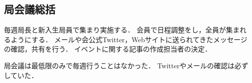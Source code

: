 \subsection*{局会議総括}



毎週局長と新入生局員で集まり実施する．
会員で日程調整をし，全員が集まれるようにする．
メールや会公式Twitter，Webサイトに送られてきたメッセージの確認，共有を行う．
イベントに関する記事の作成担当者の決定．

局会議は最低限のみで毎週行うことはなかった．
Twitterやメールの確認は必ずしていた．